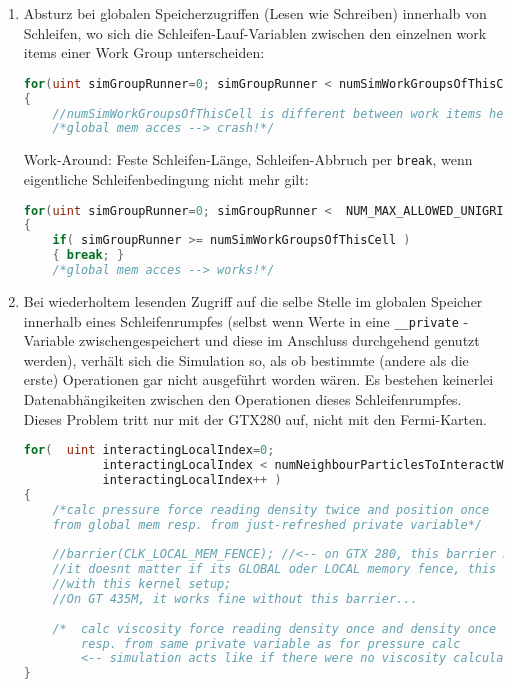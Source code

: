 		\begin{enumerate}
		
			\item Absturz bei globalen Speicherzugriffen (Lesen wie Schreiben) innerhalb von Schleifen, 
			wo sich die Schleifen-Lauf-Variablen zwischen den einzelnen work items einer
			Work Group unterscheiden:
			\begin{lstlisting}[language=OpenCL]
for(uint simGroupRunner=0; simGroupRunner < numSimWorkGroupsOfThisCell; simGroupRunner++ )
{
	//numSimWorkGroupsOfThisCell is different between work items here!
	/*global mem acces --> crash!*/
			\end{lstlisting}
			
			Work-Around: Feste Schleifen-Länge, Schleifen-Abbruch per \lstinline|break|, wenn eigentliche
			Schleifenbedingung nicht mehr gilt:
			\begin{lstlisting}[language=OpenCL]
for(uint simGroupRunner=0; simGroupRunner <  NUM_MAX_ALLOWED_UNIGRID_CELL_SPLIT_FACTOR; simGroupRunner++ )
{
	if( simGroupRunner >= numSimWorkGroupsOfThisCell )
    { break; }
    /*global mem acces --> works!*/
			\end{lstlisting}
			
		\item Bei wiederholtem lesenden Zugriff auf die selbe Stelle im 
		globalen Speicher innerhalb eines Schleifenrumpfes (selbst wenn Werte in eine 
		\lstinline|__private| -Variable zwischengespeichert und diese im Anschluss durchgehend genutzt werden),
		verhält sich die Simulation so, als ob bestimmte (andere als die erste)
		Operationen gar nicht ausgeführt worden wären. Es bestehen keinerlei Datenabhängikeiten zwischen
		den Operationen dieses Schleifenrumpfes.
		Dieses Problem tritt nur mit der GTX280 auf, nicht mit den Fermi-Karten.
		\begin{lstlisting}[language=OpenCL]
for(  uint interactingLocalIndex=0; 
           interactingLocalIndex < numNeighbourParticlesToInteractWith;
           interactingLocalIndex++ )
{  
	/*calc pressure force reading density twice and position once 
	from global mem resp. from just-refreshed private variable*/ 
	
	//barrier(CLK_LOCAL_MEM_FENCE); //<-- on GTX 280, this barrier must be commented in; 
	//it doesnt matter if its GLOBAL oder LOCAL memory fence, this is weird, as there is no local memory accces at all
	//with this kernel setup; 
	//On GT 435M, it works fine without this barrier...
	
	/*	calc viscosity force reading density once and density once from global mem 
		resp. from same private variable as for pressure calc
		<-- simulation acts like if there were no viscosity calculation at all without barrier!*/
}
		\end{lstlisting}
		

\end{enumerate}
